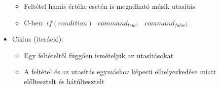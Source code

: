 \documentclass[11pt,a4paper]{article}
\begin{document}
\begin{tcolorbox}[colback=blue!5!white,colframe=blue!50!black,title= 16. Ismertesse az alapvető algoritmus-elemeket a Böhm-Jacopini tétel alapján!]
\begin{itemize}
\begin{itemize}
                        \item Feltétel hamis értéke esetén is megadható másik utasítás 
                        \item C-ben: \(if (condition)\hspace{8pt} command_{true} ;\hspace{8pt} command_{false};\)
                        \begin{center}
                        \end{center}
                    \end{itemize}
                    \item Ciklus (iteráció):
                    \begin{itemize}
                        \item Egy feltételtől függően ismételjük az utasításokat
                        \item A feltétel és az utasítás egymáshoz képesti elhelyezkedése miatt előltesztelt és hátúltesztelt
                    \end{itemize}
                    \begin{center}
                    \end{center}
                \end{itemize}
            \end{tcolorbox}
            
\end{document}
